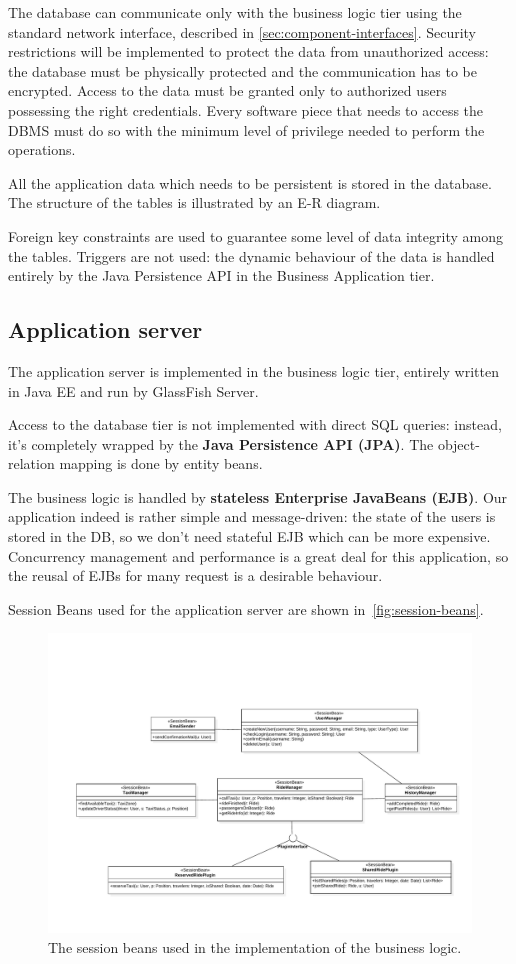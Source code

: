 The database can communicate only with the business logic tier using the standard network interface, described in \autoref{sec:component-interfaces}.
Security restrictions will be implemented to protect the data from unauthorized access: the database must be physically protected and the communication has to be encrypted. Access to the data must be granted only to authorized users possessing the right credentials. Every software piece that needs to access the DBMS must do so with the minimum level of privilege needed to perform the operations.

All the application data which needs to be persistent is stored in the database. The structure of the tables is illustrated by an E-R diagram. %

Foreign key constraints are used to guarantee some level of data integrity among the tables.
Triggers are not used: the dynamic behaviour of the data is handled entirely by the Java Persistence API in the Business Application tier.

\subsection{Application server}
The application server is implemented in the business logic tier, entirely written in Java EE and run by GlassFish Server.

Access to the database tier is not implemented with direct SQL queries: instead, it's completely wrapped by the \textbf{Java Persistence API (JPA)}. The object-relation mapping is done by entity beans.

The business logic is handled by \textbf{stateless Enterprise JavaBeans (EJB)}.
Our application indeed is rather simple and message-driven: the state of the users is stored in the DB, so we don't need stateful EJB which can be more expensive.
Concurrency management and performance is a great deal for this application, so the reusal of EJBs for many request is a desirable behaviour.

Session Beans used for the application server are shown in~\autoref{fig:session-beans}.
\begin{figure}
    \centering
    \includegraphics[width=\textwidth]{diagrams/class_sessionbeans}
    \caption{The session beans used in the implementation of the business logic.}
    \label{fig:session-beans}
\end{figure}

